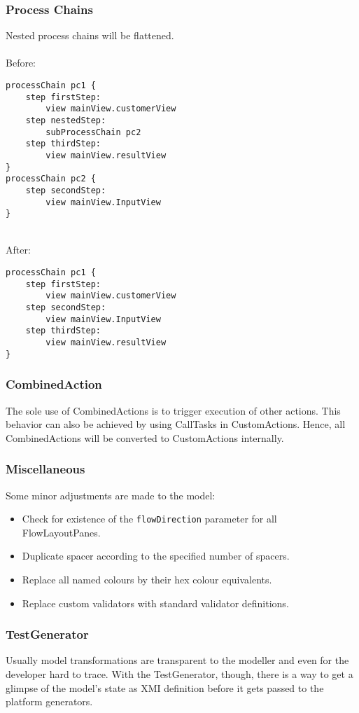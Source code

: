 \subsubsection{Process Chains}
Nested process chains will be flattened. \\ \\
Before:
\begin{lstlisting}[language=MD2]
processChain pc1 {
	step firstStep:
		view mainView.customerView
	step nestedStep:
		subProcessChain pc2
	step thirdStep:
		view mainView.resultView
}
processChain pc2 {
	step secondStep:
		view mainView.InputView
}
\end{lstlisting}
~
\\
After:
\begin{lstlisting}[language=MD2]
processChain pc1 {
	step firstStep:
		view mainView.customerView
	step secondStep:
		view mainView.InputView
	step thirdStep:
		view mainView.resultView
}

\end{lstlisting}

\subsubsection{CombinedAction}
The sole use of CombinedActions is to trigger execution of other actions. This behavior can also be achieved by using CallTasks in CustomActions. Hence, all CombinedActions will be converted to CustomActions internally.

\subsubsection{Miscellaneous}
Some minor adjustments are made to the model:

\begin{itemize}
\item Check for existence of the \lstinline!flowDirection! parameter for all FlowLayoutPanes.
\item Duplicate spacer according to the specified number of spacers.
\item Replace all named colours by their hex colour equivalents.
\item Replace custom validators with standard validator definitions.
\end{itemize}

\subsubsection{TestGenerator}
Usually model transformations are transparent to the modeller and even for the developer hard to trace. With the TestGenerator, though, there is a way to get a glimpse of the model's state as XMI definition before it gets passed to the platform generators.
